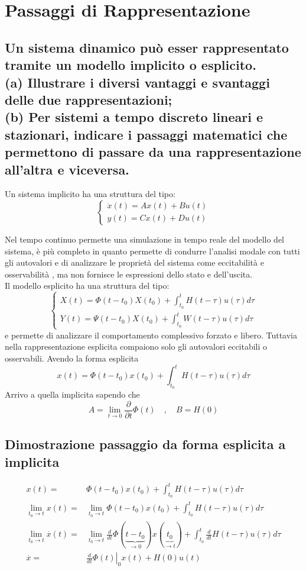 \documentclass{article}
\begin{document}
\section{Passaggi di Rappresentazione}

\subsection{Un sistema dinamico può esser rappresentato tramite un modello implicito o esplicito. \\
(a) Illustrare i diversi vantaggi e svantaggi delle due rappresentazioni; \\
(b) Per sistemi a tempo discreto lineari e stazionari, indicare i passaggi matematici che permettono
di passare da una rappresentazione all'altra e viceversa.}

Un sistema implicito ha una struttura del tipo:
$$
\begin{cases}
    \dot{x}(t) = Ax(t)+Bu(t)\\
    y(t) = Cx(t)+Du(t)
\end{cases}
$$

Nel tempo continuo permette una simulazione in tempo reale del modello del sistema, è più completo in quanto permette di condurre l'analisi modale con tutti gli autovalori e di analizzare le proprietà del sistema come eccitabilità e osservabilità , ma non fornisce le espressioni dello stato e dell'uscita.\\
Il modello esplicito ha una struttura del tipo:
\[
\begin{cases}
    X(t) = \Phi(t-t_0)X(t_0)+\int_{t_0}^{t}H(t-\tau)u(\tau)d\tau\\
    Y(t) = \Psi(t-t_0)X(t_0)+\int_{t_0}^{t}W(t-\tau)u(\tau)d\tau
\end{cases}
\]
e permette di analizzare il comportamento complessivo forzato e libero.
Tuttavia nella rappresentazione esplicita compaiono solo gli autovalori eccitabili o osservabili.
Avendo la forma esplicita 
\[     x(t) = \Phi(t-t_0)x(t_0)+\int_{t_0}^{t} H(t-\tau)u(\tau)d\tau \]
Arrivo a quella implicita sapendo che 
\[ A = \lim_{t\to 0}\frac{\partial }{\partial t}\Phi(t) \quad,\quad B = H(0) \]


\subsection{Dimostrazione passaggio da forma esplicita a implicita}

\begin{align*}
    x(t)  = & \Phi(t-t_0)x(t_0)+\int_{t_0}^{t}H(t-\tau)u(\tau)d\tau \\
    \lim_{t_0\to t}x(t)  = & \lim_{t_0\to t} \Phi(t-t_0)x(t_0)+\int_{t_0}^{t}H(t-\tau)u(\tau)d\tau \\
    \lim_{t_0\to t}\overset{\cdot}{x}(t)  = &\lim_{t_0\to t} \frac{d}{dt}\Phi(\underbrace{t-t_0}_{\to 0})x(\underbrace{t_0}_{\to t})
        +\int_{t_0}^{t}\frac{d}{dt}H(t-\tau)u(\tau)d\tau\\
        \overset{\cdot}{x}  = & \left.\frac{d}{dt}\Phi(t)\right|_{0}x(t)+H(0)u(t)
\end{align*}
\end{document}
